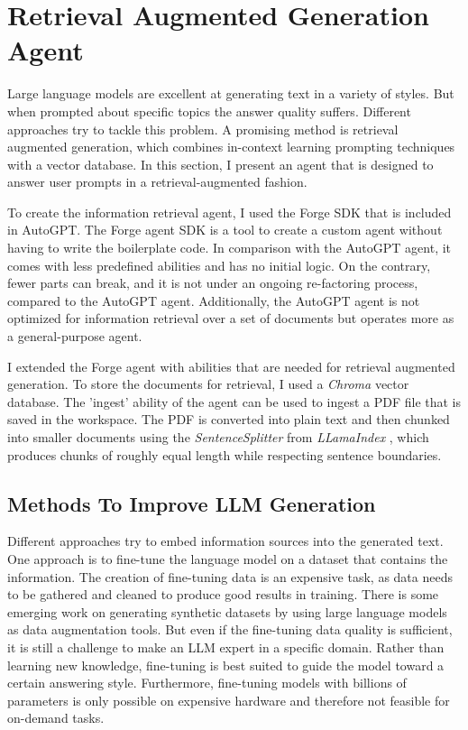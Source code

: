 \documentclass[../main.tex]{subfiles}
\begin{document}
\chapter{Retrieval Augmented Generation Agent}
\label{ch:agent}

Large language models are excellent at generating text in a variety of styles.
But when prompted about specific topics the answer quality suffers.
Different approaches try to tackle this problem.
A promising method is retrieval augmented generation, which combines in-context learning prompting techniques with a vector database.
In this section, I present an agent that is designed to answer user prompts in a retrieval-augmented fashion.

To create the information retrieval agent,
I used the Forge SDK \autocite{zotero-117} that is included in AutoGPT.
The Forge agent SDK is a tool to create a custom agent without having to write the boilerplate code.
In comparison with the AutoGPT agent, it comes with less predefined abilities and has no initial logic.
On the contrary, fewer parts can break, and it is not under an ongoing re-factoring process,
compared to the AutoGPT agent.
Additionally, the AutoGPT agent is not optimized for information retrieval over a set of documents
but operates more as a general-purpose agent.

I extended the Forge agent with abilities that are needed for retrieval augmented generation.
To store the documents for retrieval, I used a \emph{Chroma} vector database.
The 'ingest' ability of the agent can be used to ingest a PDF file that is saved in the workspace.
The PDF is converted into plain text and then chunked into smaller documents using the \emph{SentenceSplitter} from \emph{LLamaIndex} \cite{zotero-255},
which produces chunks of roughly equal length while respecting sentence boundaries.

\section{Methods To Improve LLM Generation}

Different approaches try to embed information sources into the generated text.
One approach is to fine-tune the language model on a dataset that contains the information.
The creation of fine-tuning data is an expensive task, as data needs to be gathered and cleaned to produce good results in training.
There is some emerging work on generating synthetic datasets by using large language models as data augmentation tools.
But even if the fine-tuning data quality is sufficient, it is still a challenge to make an LLM expert in a specific domain.
Rather than learning new knowledge, fine-tuning is best suited to guide the model toward a certain answering style.
Furthermore, fine-tuning models with billions of parameters is only possible on expensive hardware and therefore not feasible for on-demand tasks.
\end{document}
